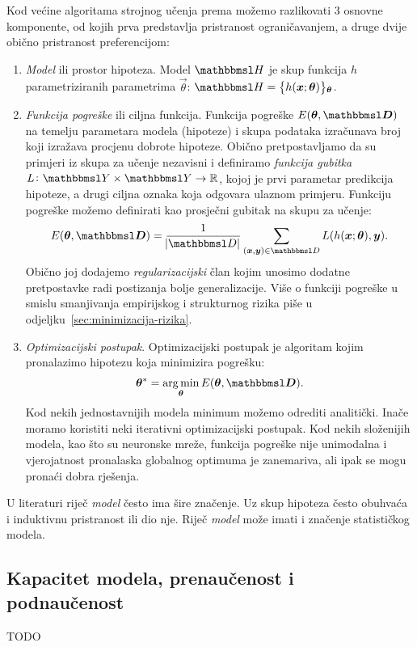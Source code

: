 \documentclass[utf8, diplomski, lmodern]{fer}
\begin{document}
Kod većine algoritama strojnog učenja prema \cite{Snajder:2014:SU} možemo razlikovati 3 osnovne komponente, od kojih prva predstavlja pristranost ograničavanjem, a druge dvije obično pristranost preferencijom:
\begin{enumerate}
	\item \emph{Model} ili prostor hipoteza. Model $\set H$ je skup funkcija $h$  parametriziranih parametrima $\vec\theta$: $\set H=\cbr{h(\vec x;\vec{\theta})}_{\vec{\theta}}$.
	\item \emph{Funkcija pogreške} ili ciljna funkcija. Funkcija pogreške $E(\vec{\theta,\set D})$ na temelju parametara modela (hipoteze) i skupa podataka izračunava broj koji izražava procjenu dobrote hipoteze. Obično pretpostavljamo da su primjeri iz skupa za učenje nezavisni i definiramo \emph{funkcija gubitka} $\funcdef{L}{\set Y\times\set Y}{\R}$, kojoj je prvi parametar predikcija hipoteze, a drugi ciljna oznaka koja odgovara ulaznom primjeru. Funkciju pogreške možemo definirati kao prosječni gubitak na skupu za učenje:
	\begin{align}
	E(\vec{\theta,\set D})=\frac{1}{\envert{\set D}}\sum_{(\vec x,\vec y)\in\set D} L(h(\vec x;\vec{\theta}),\vec y) \text{.}
	\end{align}
	Obično joj dodajemo \emph{regularizacijski} član kojim unosimo dodatne pretpostavke radi postizanja bolje generalizacije. Više o funkciji pogreške u smislu smanjivanja empirijskog i strukturnog rizika piše u odjeljku~\ref{sec:minimizacija-rizika}.
	\item \emph{Optimizacijski postupak}. Optimizacijski postupak je algoritam kojim pronalazimo hipotezu koja minimizira pogrešku:
	\begin{align}
	\vec\theta^* = \argmin_{\vec{\theta}} E(\vec{\theta,\set D}) \text{.}
	\end{align}
	Kod nekih jednostavnijih modela minimum možemo odrediti analitički. Inače moramo koristiti neki iterativni optimizacijski postupak. Kod nekih složenijih modela, kao što su neuronske mreže, funkcija pogreške nije unimodalna i vjerojatnost pronalaska globalnog optimuma je zanemariva, ali ipak se mogu pronaći dobra rješenja.
\end{enumerate}

U literaturi riječ \textit{model} često ima šire značenje. Uz skup hipoteza često obuhvaća i induktivnu pristranost ili dio nje. Riječ \textit{model} može imati i značenje statističkog modela.

\subsection{Kapacitet modela, prenaučenost i podnaučenost}
TODO
\end{document}
